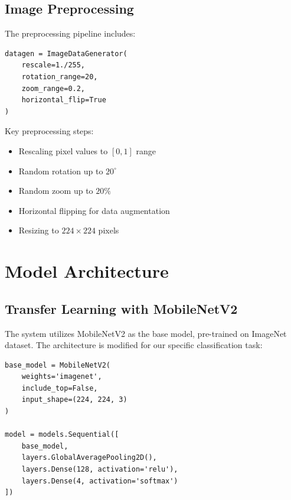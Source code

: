 \documentclass[12pt,a4paper]{article}
\begin{document}
\subsection{Image Preprocessing}
The preprocessing pipeline includes:
\begin{lstlisting}[caption=Image Preprocessing Pipeline]
datagen = ImageDataGenerator(
    rescale=1./255,
    rotation_range=20,
    zoom_range=0.2,
    horizontal_flip=True
)
\end{lstlisting}

Key preprocessing steps:
\begin{itemize}
    \item Rescaling pixel values to $[0,1]$ range
    \item Random rotation up to $20^\circ$
    \item Random zoom up to $20\%$
    \item Horizontal flipping for data augmentation
    \item Resizing to $224 \times 224$ pixels
\end{itemize}

\section{Model Architecture}

\subsection{Transfer Learning with MobileNetV2}
The system utilizes MobileNetV2 as the base model, pre-trained on ImageNet dataset. The architecture is modified for our specific classification task:

\begin{lstlisting}[caption=Model Architecture]
base_model = MobileNetV2(
    weights='imagenet',
    include_top=False,
    input_shape=(224, 224, 3)
)

model = models.Sequential([
    base_model,
    layers.GlobalAveragePooling2D(),
    layers.Dense(128, activation='relu'),
    layers.Dense(4, activation='softmax')
])
\end{lstlisting}
\end{document}
